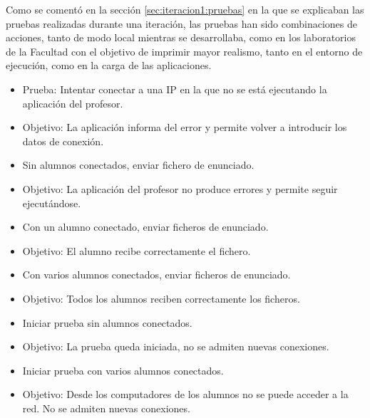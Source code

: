 Como se comentó en la sección \ref{sec:iteracion1:pruebas} en la que se explicaban las pruebas realizadas durante una iteración, las pruebas han sido combinaciones de acciones, tanto de modo local mientras se desarrollaba, como en los laboratorios de la Facultad con el objetivo de imprimir mayor realismo, tanto en el entorno de ejecución, como en la carga de las aplicaciones.
\newline



\begin{itemize}

    \item Prueba: Intentar conectar a una IP en la que no se está ejecutando la aplicación del profesor.
    \item Objetivo: La aplicación informa del error y permite volver a introducir los datos de conexión.
    \newline

    \item Sin alumnos conectados, enviar fichero de enunciado.
    \item Objetivo: La aplicación del profesor no produce errores y permite seguir ejecutándose.
    \newline

    \item Con un alumno conectado, enviar ficheros de enunciado.
    \item Objetivo: El alumno recibe correctamente el fichero.
    \newline

    \item Con varios alumnos conectados, enviar ficheros de enunciado.
    \item Objetivo: Todos los alumnos reciben correctamente los ficheros.
    \newline

    \item Iniciar prueba sin alumnos conectados.
    \item Objetivo: La prueba queda iniciada, no se admiten nuevas conexiones.
    \newline

    \item Iniciar prueba con varios alumnos conectados.
    \item Objetivo: Desde los computadores de los alumnos no se puede acceder a la red. No se admiten nuevas conexiones.
    \newline



\end{itemize}
